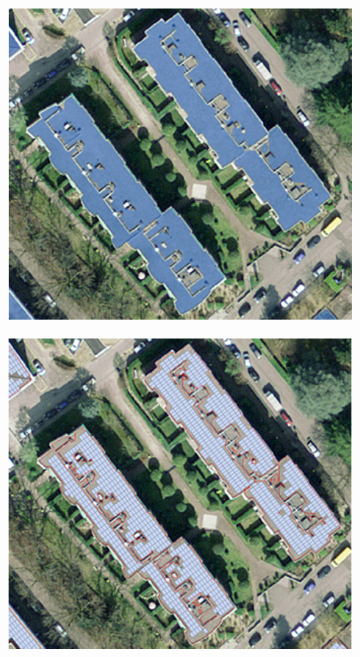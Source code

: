 \begin{figure}[tb]
\centering
\begin{subfigure}{.4\textwidth}
  \centering
  \includegraphics[width=.9\linewidth]{images/Figs/images1.png}
  \subcaption{}
  \label{figa:CNN_images}
\end{subfigure}
\begin{subfigure}{.4\textwidth}
  \centering
  \includegraphics[width=.9\linewidth]{images/Figs/images2.png}  
  \subcaption{}
    \label{figb:CNN_images}
\end{subfigure}

\end{figure}
